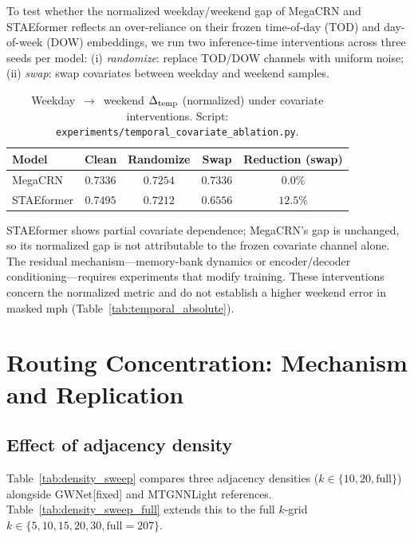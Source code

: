 To test whether the normalized weekday/weekend gap of MegaCRN and STAEformer reflects an
over-reliance on their frozen time-of-day (TOD) and day-of-week (DOW)
embeddings, we run two inference-time interventions across three seeds per
model: (i) \emph{randomize}: replace TOD/DOW channels with uniform noise;
(ii) \emph{swap}: swap covariates between weekday and weekend samples.

\begin{table}[h]
\centering
\caption{Weekday~$\to$~weekend $\Delta_{\text{temp}}$ (normalized) under covariate
interventions. Script: \texttt{experiments/temporal\_covariate\_ablation.py}.}
\label{tab:temporal_cov}
\vskip 0.05in
\small
\begin{tabular}{lccc|c}
\toprule
\textbf{Model} & \textbf{Clean} & \textbf{Randomize} & \textbf{Swap} & \textbf{Reduction (swap)} \\
\midrule
MegaCRN     & $0.7336$ & $0.7254$ & $0.7336$ & $0.0\%$ \\
STAEformer  & $0.7495$ & $0.7212$ & $0.6556$ & $12.5\%$ \\
\bottomrule
\end{tabular}
\end{table}

STAEformer shows partial covariate dependence; MegaCRN's gap is unchanged, so
its normalized gap is not attributable to the frozen covariate channel alone.
The residual mechanism---memory-bank dynamics or encoder/decoder
conditioning---requires experiments that modify training. These interventions concern the normalized metric and do not
establish a higher weekend error in masked mph (Table~\ref{tab:temporal_absolute}).

\section{Routing Concentration: Mechanism and Replication}
\label{sec:appendix_mechanism_group}

\subsection{Effect of adjacency density}
\label{sec:appendix_density_sweep}

Table~\ref{tab:density_sweep} compares three adjacency densities
($k \in \{10, 20, \text{full}\}$) alongside GWNet[fixed] and MTGNNLight references.
Table~\ref{tab:density_sweep_full} extends this to the full $k$-grid
$k \in \{5, 10, 15, 20, 30, \text{full}{=}207\}$.

